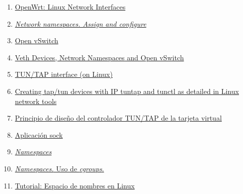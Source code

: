 \documentclass[a4paper, oneside, 12pt]{book}
\begin{document}
\begin{enumerate}
		\item
		\label{bib: openwrt virtual network interfaces}
		\href{https://openwrt.org/docs/guide-developer/networking/network.interfaces}{OpenWrt: Linux Network Interfaces}
		
		\item
		\label{bib:example netns veth}
		\href{https://blog.scottlowe.org/2013/09/04/introducing-linux-network-namespaces/}{\textit{Network namespaces. Assign and configure}}
		
		\item
		\label{bib: open vswitch}
		\href{https://www.openvswitch.org/}{Open vSwitch}
		
		\item
		\label{bib: veth netns ovs}
		\href{https://matthewarcus.wordpress.com/2018/02/04/veth-devices-network-namespaces-and-open-vswitch/}{Veth Devices, Network Namespaces and Open vSwitch}
		
		\item
		\label{bib: tun vs tap}
		\href{https://www.gabriel.urdhr.fr/2021/05/08/tuntap/}{TUN/TAP interface (on Linux)}
		
		\item
		\label{bib: tunctl + ip}
		\href{https://developpaper.com/creating-tap-tun-devices-with-ip-tuntap-and-tunctl-as-detailed-in-linux-network-tools/}{Creating tap/tun devices with IP tuntap and tunctl as detailed in Linux network tools}
		
		\item
		\label{bib: code tuntap.c}
		\href{https://programmerclick.com/article/45831226469/}{Principio de diseño del controlador TUN/TAP de la tarjeta virtual}
		
		\item
		\label{bib: sock}
		\href{http://www.icir.org/christian/sock.html}{Aplicación sock}
		
		\item 
		\label{bib:ns overview} \href{https://lwn.net/Articles/531114/}{\textit{Namespaces}}
		
		\item 
		\label{bib:link5} \href{https://locurastecnicas.blogspot.com/2020/09/linux-namespaces-y-cgroups.html}{\textit{Namespaces.} Uso de \textit{cgroups}.}
		
		\item 
		\label{bib:ns tutorial1} \href{https://laurel.datsi.fi.upm.es/~ssoo/SOA/namespaces.html}{Tutorial: Espacio de nombres en Linux}
		

\end{enumerate}
\end{document}
